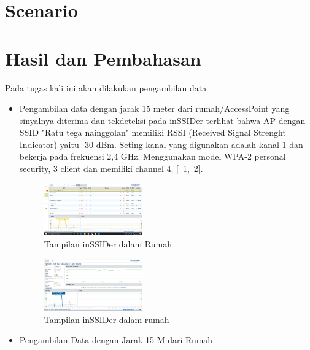 \documentclass[conference]{IEEEtran}
\begin{document}
\section{Scenario}

\vspace{2cm}

\section{Hasil dan Pembahasan}
\vspace{0.2cm}

Pada tugas kali ini akan dilakukan pengambilan data
\begin{itemize}
\item Pengambilan data dengan jarak 15 meter dari rumah/AccessPoint 
yang sinyalnya diterima dan tekdeteksi pada inSSIDer terlihat bahwa AP dengan SSID 
"Ratu tega nainggolan" memiliki RSSI (Received Signal Strenght Indicator) yaitu -30 dBm. 
Seting kanal yang digunakan adalah kanal 1 dan bekerja pada frekuensi 2,4 GHz. 
Menggunakan model WPA-2 personal security, 3 client dan memiliki channel 4. [~\ref{tampilan dalam rumah_1},~\ref{tampilan dalam rumah_2}].
\vspace{0.2cm}
\begin{figure}
    \centering
    \includegraphics[width=0.4\textwidth]{8.png}
    \caption{Tampilan inSSIDer dalam Rumah}
    \label{tampilan dalam rumah_1}
\end{figure}

\begin{figure}
    \centering
    \includegraphics[width=0.4\textwidth]{9.png}
    \caption{Tampilan inSSIDer dalam rumah}
    \label{tampilan dalam rumah_2}
\end{figure}

\vspace{4 cm}

    \item Pengambilan Data dengan Jarak 15 M dari Rumah


\end{itemize}
\end{document}
